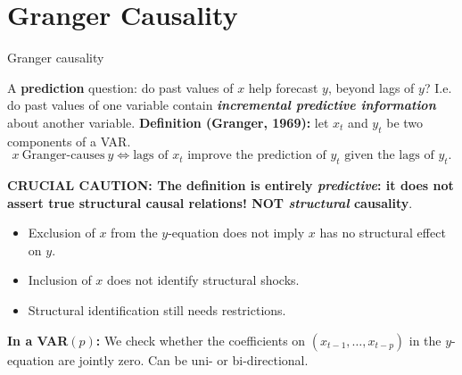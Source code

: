 \documentclass{beamer}
\begin{document}
\section{Granger Causality}

\begin{frame}{Granger causality}

A \textbf{prediction} question: do past values of $x$ help forecast $y$, beyond lags of $y$? I.e. do past values of one variable contain \textbf{\emph{incremental predictive information}} about another variable.
\medskip
\textbf{Definition (Granger, 1969):} let $x_t$ and $y_t$ be two components of a VAR.
\[
x \ \text{Granger-causes} \ y
\Longleftrightarrow
\text{lags of } x_t \text{ improve the prediction of } y_t
\text{ given the lags of } y_t.
\]
\medskip

\textbf{CRUCIAL CAUTION: The definition is entirely \emph{predictive}: it does not assert true structural causal relations! NOT \textit{structural} causality}.  
\begin{itemize}
    \item Exclusion of $x$ from the $y$-equation does not imply $x$ has no structural effect on $y$.
    \item Inclusion of $x$ does not identify structural shocks.
    \item Structural identification still needs restrictions.
\end{itemize}
\bigskip

\textbf{In a VAR$(p)$:}
We check whether the coefficients on $(x_{t-1},\ldots,x_{t-p})$ in the $y$-equation are jointly zero. Can be uni- or bi-directional.

\end{frame}
\end{document}
